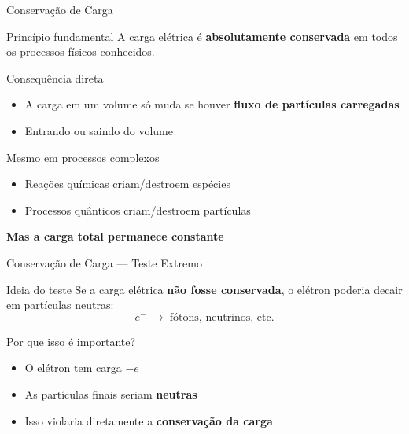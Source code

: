 \documentclass[aspectratio=169]{beamer}
\begin{document}
\begin{frame}{Conservação de Carga}

\begin{block}{Princípio fundamental}
A carga elétrica é \textbf{absolutamente conservada} em todos os processos físicos conhecidos.
\end{block}

\vspace{0.2cm}

\begin{block}{Consequência direta}
\begin{itemize}
\item A carga em um volume só muda se houver \textbf{fluxo de partículas carregadas}
\item Entrando ou saindo do volume
\end{itemize}
\end{block}

\vspace{0.2cm}

\begin{alertblock}{Mesmo em processos complexos}
\begin{itemize}
\item Reações químicas criam/destroem espécies
\item Processos quânticos criam/destroem partículas
\end{itemize}

\centering
\textbf{Mas a carga total permanece constante}
\end{alertblock}



\end{frame}

\begin{frame}{Conservação de Carga — Teste Extremo}

\begin{block}{Ideia do teste}
Se a carga elétrica \textbf{não fosse conservada}, o elétron poderia decair em partículas neutras:
\[
e^- \;\rightarrow\; \text{fótons, neutrinos, etc.}
\]
\end{block}

\vspace{0.3cm}

\begin{alertblock}{Por que isso é importante?}
\begin{itemize}
\item O elétron tem carga $-e$
\item As partículas finais seriam \textbf{neutras}
\item Isso violaria diretamente a \textbf{conservação da carga}
\end{itemize}
\end{alertblock}

\end{frame}
\end{document}
